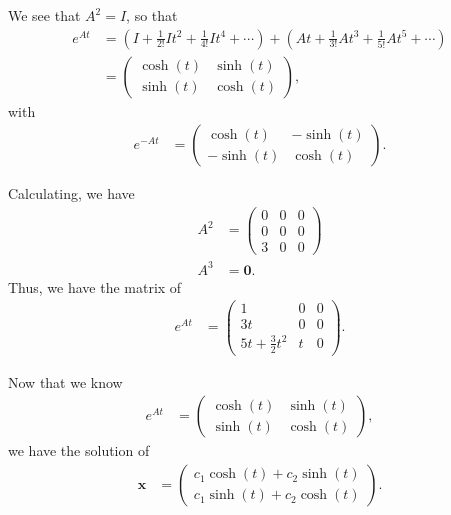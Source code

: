 \documentclass[10pt]{mypackage}
\begin{document}
\begin{solution}[8.4, Problem 2]
  We see that $A^2 = I$, so that
  \begin{align*}
    e^{At} &= \left( I + \frac{1}{2!}I t^2 + \frac{1}{4!}I t^{4} + \cdots \right) + \left( At + \frac{1}{3!}At^3 + \frac{1}{5!}At^{5} + \cdots \right)\\
           &= \begin{pmatrix}\cosh(t) & \sinh(t) \\ \sinh(t) & \cosh(t)\end{pmatrix},
  \end{align*}
  with
  \begin{align*}
    e^{-At} &= \begin{pmatrix}\cosh(t) & -\sinh(t) \\ -\sinh(t) & \cosh(t)\end{pmatrix}.
  \end{align*}
\end{solution}
\begin{solution}[8.4, Problem 4]
  Calculating, we have
  \begin{align*}
    A^2 &= \begin{pmatrix}0 & 0 & 0 \\ 0 & 0 & 0 \\ 3 & 0 & 0\end{pmatrix}\\
    A^3 &= \mathbf{0}.
  \end{align*}
  Thus, we have the matrix of
  \begin{align*}
    e^{At} &= \begin{pmatrix}1 & 0 & 0\\ 3t & 0 & 0 \\ 5t + \frac{3}{2}t^2 & t & 0\end{pmatrix}.
  \end{align*}
\end{solution}
\begin{solution}[8.4, Problem 6]
  Now that we know
  \begin{align*}
    e^{At} &= \begin{pmatrix}\cosh(t) & \sinh(t) \\ \sinh(t) & \cosh(t)\end{pmatrix},
  \end{align*}
  we have the solution of
  \begin{align*}
    \mathbf{x} &= \begin{pmatrix}c_1\cosh(t) + c_2\sinh(t) \\ c_1\sinh(t) + c_2\cosh(t)\end{pmatrix}.
  \end{align*}
\end{solution}
\end{document}
